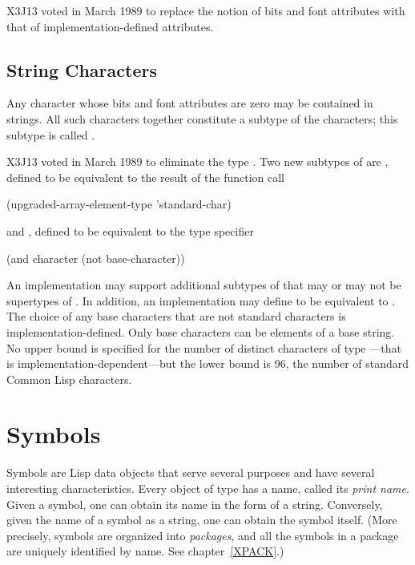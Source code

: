 {\begin{newer}
X3J13 voted in March 1989 
to replace the notion of bits and font attributes with
that of implementation-defined attributes.
\end{newer}

\begin{obsolete}
\subsection{String Characters}

Any character whose bits and font attributes are zero may be contained
in strings.  All such characters together constitute a subtype of
the characters; this subtype is called .
\end{obsolete}


\begin{newer}
X3J13 voted in March 1989 
to eliminate the type .
Two new subtypes of  are ,
defined to be equivalent to the result of the function call
\begin{lisp}
(upgraded-array-element-type 'standard-char)
\end{lisp}
and , defined to be equivalent to the type specifier
\begin{lisp}
(and character (not base-character))
\end{lisp}
An implementation may support additional subtypes of 
that may or may not be supertypes of .
In addition, an implementation may define 
to be equivalent to .  The choice of any base characters
that are not standard characters is implementation-defined.
Only base characters can be elements of a base string.
No upper bound is specified for the number of distinct characters
of type ---that is implementation-dependent---but the lower
bound is 96, the number of standard Common Lisp characters.
\end{newer}

\section{Symbols}

Symbols are Lisp data objects that serve several purposes
and have several interesting characteristics.  Every object of
type  has a name,
called its {\it print name}.  Given a symbol, one can
obtain its name in the form of a string.  Conversely,
given the name of a symbol as a string, one can obtain the
symbol itself.  (More precisely, symbols are organized into
{\it packages}, and all the symbols in a package are uniquely
identified by name.  See chapter~\ref{XPACK}.)

}
